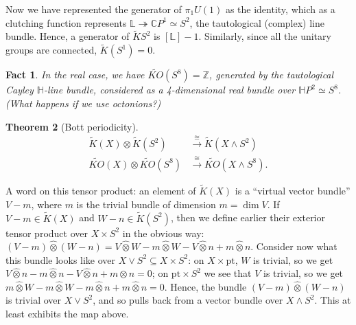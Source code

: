 \documentclass{article}
\newcommand{\Z}{\mathbb{Z}}
\newcommand{\C}{\mathbb{C}}
\newcommand{\CP}{\C P}
\newcommand{\bundle}[1]{\mathbb{#1}}
\newcommand{\sprod}{\wedge}
\newcommand{\wsum}{\vee}
\newcommand{\ptspace}{\mathrm{pt}}
\newcommand{\onto}{\twoheadrightarrow}
\newtheorem{thm}{Theorem}[section]
\newtheorem{fact}[thm]{Fact}
\begin{document}
Now we have represented the generator of $\pi_1 U(1)$ as the identity, which as a clutching function represents $\bundle{L} \onto \CP^1 \simeq S^2$, the tautological (complex) line bundle.  Hence, a generator of $\widetilde K S^2$ is $[\bundle L] - 1$.  Similarly, since all the unitary groups are connected, $\widetilde K(S^1) = 0$.

\begin{fact}
In the real case, we have $\widetilde{KO}(S^8) = \Z$, generated by the tautological Cayley $\mathbb{H}$-line bundle, considered as a 4-dimensional real bundle over $\mathbb{H}P^2 \simeq S^8$. (What happens if we use octonions?) %
\end{fact}

\begin{thm}[Bott periodicity]
\begin{align*}
\widetilde K (X) \otimes \widetilde K (S^2) & \stackrel{\cong}{\to} \widetilde K(X \sprod S^2) \\
\widetilde{KO} (X) \otimes \widetilde{KO} (S^8) & \stackrel{\cong}{\to} \widetilde{KO}(X \sprod S^8).
\end{align*}
\end{thm}

A word on this tensor product: an element of $\widetilde K (X)$ is a ``virtual vector bundle'' $V - m$, where $m$ is the trivial bundle of dimension $m = \dim V$.  If $V - m \in \widetilde K(X)$ and $W - n \in \widetilde K(S^2)$, then we define earlier their exterior tensor product over $X \times S^2$ in the obvious way: $(V - m)\hat\otimes(W - n) = V \hat\otimes W - m \hat\otimes W - V \hat\otimes n + m \hat\otimes n$.  Consider now what this bundle looks like over $X \vee S^2 \subseteq X \times S^2$: on $X \times \ptspace$, $W$ is trivial, so we get $V \hat\otimes n - m \hat\otimes n - V \hat\otimes n + m \hat\otimes n = 0$; on $\ptspace \times S^2$ we see that $V$ is trivial, so we get $m \hat\otimes W - m \hat\otimes W - m \hat\otimes n + m \hat\otimes n = 0$.  Hence, the bundle $(V - m) \hat\otimes (W - n)$ is trivial over $X \wsum S^2$, and so pulls back from a vector bundle over $X \sprod S^2$.  This at least exhibits the map above.
\end{document}
